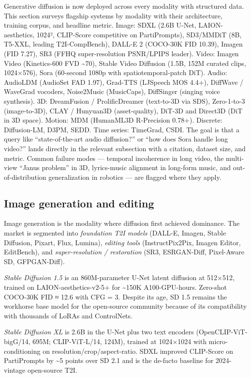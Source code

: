 \documentclass{article}
\begin{document}
Generative diffusion is now deployed across every modality with structured data. This section surveys flagship systems by modality with their architecture, training corpus, and headline metric. Image: SDXL (2.6B U-Net, LAION-aesthetics, 1024², CLIP-Score competitive on PartiPrompts), SD3/MMDiT (8B, T5-XXL, leading T2I-CompBench), DALL-E 2 (COCO-30K FID 10.39), Imagen (FID 7.27), SR3 (FFHQ super-resolution PSNR/LPIPS leader). Video: Imagen Video (Kinetics-600 FVD \textasciitilde70), Stable Video Diffusion (1.5B, 152M curated clips, 1024×576), Sora (60-second 1080p with spatiotemporal-patch DiT). Audio: AudioLDM (AudioSet FAD 1.97), Grad-TTS (LJSpeech MOS 4.4+), DiffWave / WaveGrad vocoders, Noise2Music (MusicCaps), DiffSinger (singing voice synthesis). 3D: DreamFusion / ProlificDreamer (text-to-3D via SDS), Zero-1-to-3 (image-to-3D), CLAY / Hunyuan3D (asset-quality), DiT-3D and Direct3D (DiT in 3D space). Motion: MDM (HumanML3D R-Precision 0.78+). Discrete: Diffusion-LM, D3PM, SEDD. Time series: TimeGrad, CSDI. The goal is that a query like ``state-of-the-art audio diffusion?'' or ``how does Sora handle long video?'' lands directly in the relevant subsection with a citation, dataset size, and metric. Common failure modes --- temporal incoherence in long video, the multi-view ``Janus problem'' in 3D, lyrics-music alignment in long-form music, and out-of-distribution generalization in robotics --- are flagged where they apply.

\subsection{Image generation and editing}\label{image-generation-and-editing}

Image generation is the modality where diffusion first achieved dominance. The market is segmented into \emph{foundation T2I models} (DALL-E, Imagen, Stable Diffusion, Pixart, Flux, Lumina), \emph{editing tools} (InstructPix2Pix, Imagen Editor, EditBench), and \emph{super-resolution / restoration} (SR3, ESRGAN-Diff, Pixel-Aware SD, GFPGAN-Diff).

\emph{Stable Diffusion 1.5} \citep{rombach2022highresolutionimag} is an 860M-parameter U-Net latent diffusion at 512×512, trained on LAION-aesthetics-v2-5+ for \textasciitilde150K A100-GPU-hours. Zero-shot COCO-30K FID ≈ 12.6 with CFG = 3. Despite its age, SD 1.5 remains the workhorse base model for the open-source community because of its compatibility with thousands of LoRAs and ControlNets.

\emph{Stable Diffusion XL} \citep{podell2023sdxlimprovinglaten} is 2.6B in the U-Net plus two text encoders (OpenCLIP-ViT-bigG/14, 695M; CLIP-ViT-L/14, 124M), trained at 1024×1024 with micro-conditioning on resolution/crop/aspect-ratio. SDXL improved CLIP-Score on PartiPrompts by \textasciitilde5 points over SD 2.1 and is the de-facto baseline for 2024-vintage open-source T2I.
\end{document}
